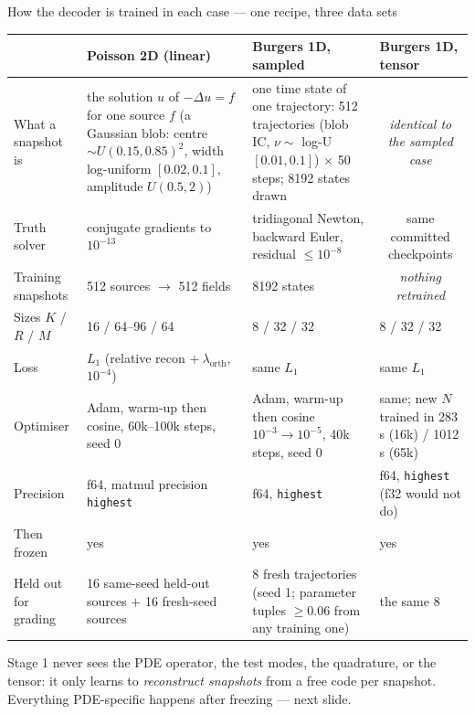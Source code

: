\documentclass[10pt,aspectratio=169]{beamer}
\begin{document}
\begin{frame}{How the decoder is trained in each case --- one recipe, three data sets}
  \centering\scriptsize
  \renewcommand{\arraystretch}{1.15}
  \begin{tabular}{@{}p{}p{}p{}p{}@{}}
    \toprule
     & \textbf{Poisson 2D (linear)} & \textbf{Burgers 1D, sampled} & \textbf{Burgers 1D, tensor}\\
    \midrule
    What a snapshot is & the solution $u$ of $-\Delta u = f$ for one source $f$ (a Gaussian blob: centre $\sim U(0.15,0.85)^2$, width log-uniform $[0.02,0.1]$, amplitude $U(0.5,2)$) & one time state of one trajectory: 512 trajectories (blob IC, $\nu\sim$ log-U$[0.01,0.1]$) $\times$ 50 steps; 8192 states drawn & \multicolumn{1}{c}{\emph{identical to the sampled case}}\\
    Truth solver & conjugate gradients to $10^{-13}$ & tridiagonal Newton, backward Euler, residual $\le 10^{-8}$ & \multicolumn{1}{c}{same committed checkpoints}\\
    Training snapshots & 512 sources $\to$ 512 fields & 8192 states & \multicolumn{1}{c}{\emph{nothing retrained}}\\
    Sizes $K$ / $R$ / $M$ & 16 / 64--96 / 64 & 8 / 32 / 32 & 8 / 32 / 32\\
    Loss & $L_1$ (relative recon $+\ \lambda_{\mathrm{orth}}$, $10^{-4}$) & same $L_1$ & same $L_1$\\
    Optimiser & Adam, warm-up then cosine, 60k--100k steps, seed 0 & Adam, warm-up then cosine $10^{-3}\!\to\!10^{-5}$, 40k steps, seed 0 & same; new $N$ trained in 283 s (16k) / 1012 s (65k)\\
    Precision & f64, matmul precision \texttt{highest} & f64, \texttt{highest} & f64, \texttt{highest} (f32 would not do)\\
    Then frozen & yes & yes & yes\\
    Held out for grading & 16 same-seed held-out sources $+$ 16 fresh-seed sources & 8 fresh trajectories (seed 1; parameter tuples $\ge 0.06$ from any training one) & the same 8\\
    \bottomrule
  \end{tabular}

  \vspace{2mm}\small
  Stage 1 never sees the PDE operator, the test modes, the quadrature, or the tensor: it only learns to \emph{reconstruct snapshots} from a free code per snapshot. Everything PDE-specific happens after freezing --- next slide.
\end{frame}
\end{document}
